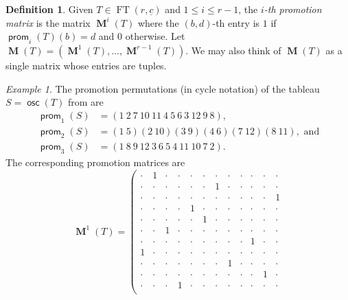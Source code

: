 \documentclass{amsart}
\theoremstyle{definition}
\newtheorem{definition}[theorem]{Definition}
\theoremstyle{remark}
\newtheorem{example}[theorem]{Example}
\numberwithin{equation}{section}
\DeclareMathOperator{\osc}{\mathsf{osc}}
\DeclareMathOperator{\ft}{FT}
\DeclareMathOperator{\prom}{\mathsf{prom}}
\DeclareMathOperator{\PM}{\mathbf{M}}
\begin{document}
\begin{definition}\label{def:prom-mats}
    Given $T \in \ft(r,\underline{c})$ and $1\leq i\leq r-1$, the \textit{$i$-th promotion matrix} is the matrix $\PM^i(T)$ where the $(b, d)$-th entry is $1$ if $\prom_i(T)(b) = d$ and $0$ otherwise. Let $\PM(T) = (\PM^1(T), \ldots, \PM^{r-1}(T))$. We may also think of $\PM(T)$ as a single matrix whose entries are tuples.
\end{definition}

\begin{example}
    The promotion permutations (in cycle notation) of the tableau $S = \osc(T)$ from  are
    \begin{align*}
        \prom_1(S)& = (1\ 2\ 7\ 10\ 11\ 4\ 5\ 6\ 3\ 12\ 9\ 8), \\
\prom_2(S) &= (1\ 5)(2\ 10)(3\ 9)(4\ 6)(7\ 12)(8\ 11), \text{ and} \\
\prom_3(S) &= (1\ 8\ 9\ 12\ 3\ 6\ 5\ 4\ 11\ 10\ 7\ 2).
    \end{align*}
    The corresponding promotion matrices are
    \[
    \PM^1(T) =
\left(\begin{smallmatrix}
\cdot & 1 & \cdot & \cdot & \cdot & \cdot & \cdot & \cdot & \cdot & \cdot & \cdot & \cdot \\
\cdot & \cdot & \cdot & \cdot & \cdot & \cdot & 1 & \cdot & \cdot & \cdot & \cdot & \cdot \\
\cdot & \cdot & \cdot & \cdot & \cdot & \cdot & \cdot & \cdot & \cdot & \cdot & \cdot & 1 \\
\cdot & \cdot & \cdot & \cdot & 1 & \cdot & \cdot & \cdot & \cdot & \cdot & \cdot & \cdot \\
\cdot & \cdot & \cdot & \cdot & \cdot & 1 & \cdot & \cdot & \cdot & \cdot & \cdot & \cdot \\
\cdot & \cdot & 1 & \cdot & \cdot & \cdot & \cdot & \cdot & \cdot & \cdot & \cdot & \cdot \\
\cdot & \cdot & \cdot & \cdot & \cdot & \cdot & \cdot & \cdot & \cdot & 1 & \cdot & \cdot \\
1 & \cdot & \cdot & \cdot & \cdot & \cdot & \cdot & \cdot & \cdot & \cdot & \cdot & \cdot \\
\cdot & \cdot & \cdot & \cdot & \cdot & \cdot & \cdot & 1 & \cdot & \cdot & \cdot & \cdot \\
\cdot & \cdot & \cdot & \cdot & \cdot & \cdot & \cdot & \cdot & \cdot & \cdot & 1 & \cdot \\
\cdot & \cdot & \cdot & 1 & \cdot & \cdot & \cdot & \cdot & \cdot & \cdot & \cdot & \cdot \\

\end{smallmatrix}\]
\end{example}
\end{document}
